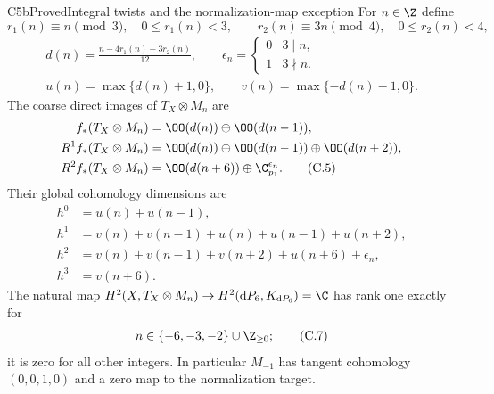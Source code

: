 \begin{statement}{C5b}{Proved}{Integral twists and the normalization-map exception}
For $n\in\Z$ define
\[
 r_1(n)\equiv n\pmod3,\quad 0\le r_1(n)<3,
 \qquad r_2(n)\equiv3n\pmod4,\quad0\le r_2(n)<4,
\]
\begin{gather*}
 d(n)=\frac{n-4r_1(n)-3r_2(n)}{12},\qquad
 \epsilon_n=\begin{cases}0&3\mid n,\\1&3\nmid n.\end{cases}
\\
 u(n)=\max\{d(n)+1,0\},\qquad
 v(n)=\max\{-d(n)-1,0\}.
\end{gather*}
The coarse direct images of $T_X\otimes M_n$ are
\begin{align*}
 f_*(T_X\otimes M_n)&=\OO(d(n))\oplus\OO(d(n-1)),\\
 R^1f_*(T_X\otimes M_n)&=\OO(d(n))\oplus\OO(d(n-1))\oplus\OO(d(n+2)),\\
 R^2f_*(T_X\otimes M_n)&=\OO(d(n+6))\oplus\C_{p_1}^{\epsilon_n}.\tag{C.5}
\end{align*}
Their global cohomology dimensions are
\begin{align*}
 h^0&=u(n)+u(n-1),\\
 h^1&=v(n)+v(n-1)+u(n)+u(n-1)+u(n+2),\\
 h^2&=v(n)+v(n-1)+v(n+2)+u(n+6)+\epsilon_n,\\
 h^3&=v(n+6).                                             \tag{C.6}
\end{align*}
The natural map $H^2(X,T_X\otimes M_n)\to H^2(\mathrm dP_6,K_{\mathrm dP_6})=\C$ has rank one exactly for
\[
 n\in\{-6,-3,-2\}\cup\Z_{\ge0};                         \tag{C.7}
\]
it is zero for all other integers. In particular $M_{-1}$ has tangent cohomology $(0,0,1,0)$ and a zero map to the normalization target.
\end{statement}

